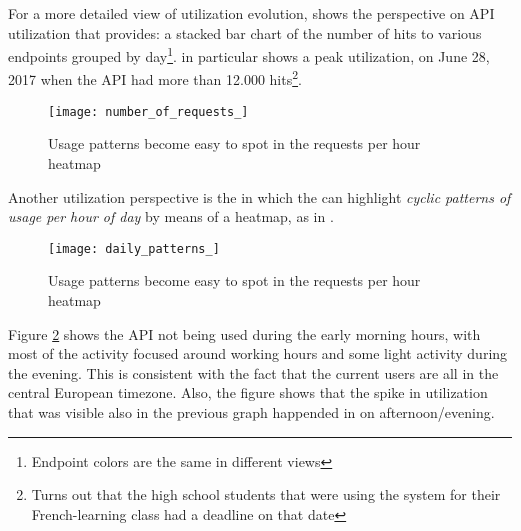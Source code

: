 \niceseparator


  For a more detailed view of utilization evolution,  shows the  perspective on API utilization that \tool provides: a stacked bar chart of the number of hits to various endpoints grouped by day\footnote{Endpoint colors are the same in different views}.  in particular shows a peak utilization, on June 28, 2017 when the API had more than 12.000 hits\footnote{Turns out that the high school students that were using the system for their French-learning class had a deadline on that date}. 

    \begin{figure}[!ht]
    \centering
    \texttt{[image: number\_of\_requests\_]}
    \caption{Usage patterns become easy to spot in the requests per hour heatmap}
    \label{fig:aeu}
    \end{figure}


\niceseparator


  Another utilization perspective is the  in which  the \tool can highlight {\em cyclic patterns of usage per hour of day} by means of a heatmap, as in . 


    \begin{figure}
      \centering
      \texttt{[image: daily\_patterns\_]}
      \caption{Usage patterns become easy to spot in the requests per hour heatmap}
      \label{fig:dp}
    \end{figure}


  Figure \ref{fig:dp} shows the API not being used during the early morning hours, with most of the activity focused around working hours and some light activity during the evening. This is consistent with the fact that the current users are all in the central European timezone. Also, the figure shows that the spike in utilization that was visible also in the previous graph happended in on afternoon/evening.







